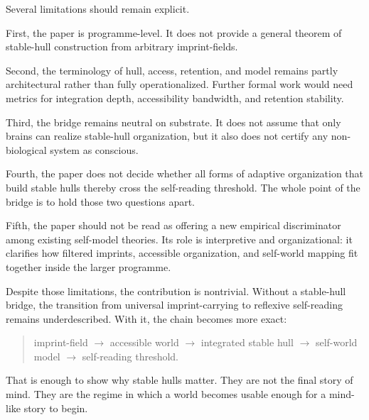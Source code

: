 \documentclass[12pt]{article}
\begin{document}
Several limitations should remain explicit.

First, the paper is programme-level. It does not provide a general theorem of stable-hull construction from arbitrary imprint-fields.

Second, the terminology of hull, access, retention, and model remains partly architectural rather than fully operationalized. Further formal work would need metrics for integration depth, accessibility bandwidth, and retention stability.

Third, the bridge remains neutral on substrate. It does not assume that only brains can realize stable-hull organization, but it also does not certify any non-biological system as conscious.

Fourth, the paper does not decide whether all forms of adaptive organization that build stable hulls thereby cross the self-reading threshold. The whole point of the bridge is to hold those two questions apart.

Fifth, the paper should not be read as offering a new empirical discriminator among existing self-model theories. Its role is interpretive and organizational: it clarifies how filtered imprints, accessible organization, and self-world mapping fit together inside the larger programme.

Despite those limitations, the contribution is nontrivial. Without a stable-hull bridge, the transition from universal imprint-carrying to reflexive self-reading remains underdescribed. With it, the chain becomes more exact:

\begin{quote}
imprint-field $\to$ accessible world $\to$ integrated stable hull $\to$ self-world model $\to$ self-reading threshold.
\end{quote}

That is enough to show why stable hulls matter. They are not the final story of mind. They are the regime in which a world becomes usable enough for a mind-like story to begin.
\end{document}

